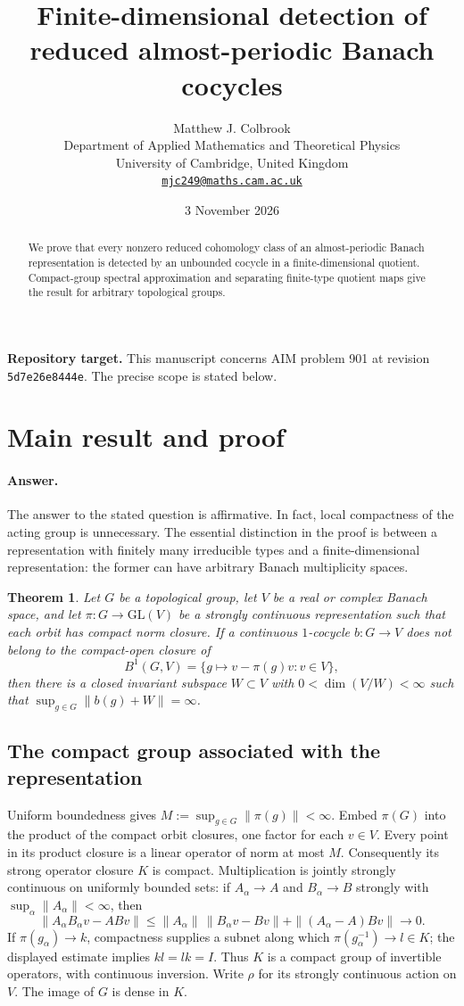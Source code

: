 \documentclass[11pt,a4paper]{article}
\title{\textbf{Finite-dimensional detection of reduced almost-periodic Banach cocycles}}
\author{Matthew J. Colbrook\\[3pt]
{\small Department of Applied Mathematics and Theoretical Physics}\\
{\small University of Cambridge, United Kingdom}\\
{\small\href{mailto:mjc249@maths.cam.ac.uk}{\texttt{mjc249@maths.cam.ac.uk}}}}
\date{3 November 2026}
\newtheorem{theorem}{Theorem}[section]
\theoremstyle{remark}
\begin{document}
\maketitle
\begin{abstract}
We prove that every nonzero reduced cohomology class of an almost-periodic Banach representation is detected by an unbounded cocycle in a finite-dimensional quotient. Compact-group spectral approximation and separating finite-type quotient maps give the result for arbitrary topological groups.
\end{abstract}
\noindent\textbf{Repository target.}
This manuscript concerns AIM problem 901 at revision
\texttt{5d7e26e8444e}. The precise scope is stated below.
\medskip

\section{Main result and proof}
\label{sec:901}

\paragraph{Answer.} The answer to the stated question is affirmative. In fact,
local compactness of the acting group is unnecessary. The essential distinction
in the proof is between a representation with finitely many irreducible types
and a finite-dimensional representation: the former can have arbitrary Banach
multiplicity spaces.

\begin{theorem}\label{thm:901}
Let $G$ be a topological group, let $V$ be a real or complex Banach space, and
let $\pi:G\to\mathrm{GL}(V)$ be a strongly continuous representation such that
each orbit has compact norm closure. If a continuous $1$-cocycle $b:G\to V$
does not belong to the compact-open closure of
\[
 B^1(G,V)=\{g\mapsto v-\pi(g)v:v\in V\},
\]
then there is a closed invariant subspace $W\subset V$ with
$0<\dim(V/W)<\infty$ such that $\sup_{g\in G}\|b(g)+W\|=\infty$.
\end{theorem}

\subsection{The compact group associated with the representation}

Uniform boundedness gives $M:=\sup_{g\in G}\|\pi(g)\|<\infty$.
Embed $\pi(G)$ into the product of the compact orbit closures, one factor
for each $v\in V$. Every point in its product closure is a linear operator
of norm at most $M$. Consequently its strong operator closure $K$ is compact.
Multiplication is jointly strongly continuous on uniformly bounded sets:
if $A_\alpha\to A$ and $B_\alpha\to B$ strongly with
$\sup_\alpha\|A_\alpha\|<\infty$, then
\[
 \|A_\alpha B_\alpha v-ABv\|
 \le \|A_\alpha\|\,\|B_\alpha v-Bv\|
       +\|(A_\alpha-A)Bv\|\longrightarrow0.
\]
If $\pi(g_\alpha)\to k$, compactness supplies a subnet along which
$\pi(g_\alpha^{-1})\to l\in K$; the displayed estimate implies
$kl=lk=I$. Thus $K$ is a compact group of invertible operators, with
continuous inversion. Write $\rho$ for its strongly continuous action on $V$.
The image of $G$ is dense in $K$.
\end{document}
